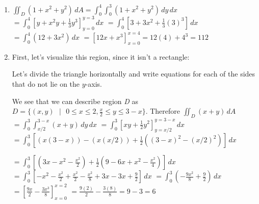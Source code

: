 \begin{Answer}[ref = total_mass]
\begin{enumerate}
    \item $\iint_{\textit{D}} \left(1 + x^2 + y^2 \right)\,dA = \int_0^4 
    \int_0^3 \left( 1  + x^2 + y^2 \right)\,dy\,dx$ $= \int_0^4 \left[y + x^2y 
    + \frac{1}{3}y^3 \right]_{y = 0}^{y = 3}\,dx$ $= \int_0^4 \left[ 3 + 3x^2 
    + \frac{1}{3}(3)^3 \right]\,dx$ $= \int_0^4 \left(12 + 3x^2 \right)\,dx$ 
    $= \left[ 12x + x^3 \right]_{x = 0}^{x = 4} = 12(4) + 4^3 = 112$
    \item First, let's visualize this region, since it isn't a rectangle:
    

    Let's divide the triangle horizontally and write equations for each of the 
    sides that do not lie on the $y$-axis.


    We see that we can describe region \textit{D} as $\textit{D} = \{ (x, y) 
    \text{ }|\text{ } 0 \leq x \leq 2, \frac{x}{2} \leq y \leq 3 - x\}$. 
    Therefore $\iint_{\textit{D}} \left( x + y \right) \,dA$ $= \int_0^3 \int_{
    x/2}^{3 - x} \left(x + y \right)\,dy\,dx$ $= \int_0^3 \left[xy + 
    \frac{1}{2} y^2 \right]_{y = x/2}^{y = 3 - x}\,dx$ $= \int_0^3 \left[ 
    \left(x(3 - x) \right) - \left(x (x/2) \right) + \frac{1}{2} \left( (3 - 
    x)^2 - (x/2)^2 \right) \right]\,dx$ 
    
    $= \int_0^3 \left[ \left(3x - x^2 - 
    \frac{x^2}{2} \right) + \frac{1}{2} \left( 9 - 6x + x^2 - \frac{x^2}{4} 
    \right) \right]\,dx$ $= \int_0^3 \left[-x^2 - \frac{x^2}{2} + \frac{x^2}{2}
    - \frac{x^2}{8} + 3x - 3x + \frac{9}{2} \right]\,dx$ $= \int_0^3 \left( -
    \frac{9x^2}{8} + \frac{9}{2} \right)\,dx$ $= \left[ \frac{9x}{2} -\frac{
    3x^3}{8} \right]_{x = 0}^{x = 2}$ $= \frac{9(2)}{2} - \frac{3(8)}{8} = 9 - 
    3 = 6$
\end{enumerate}
\end{Answer}

